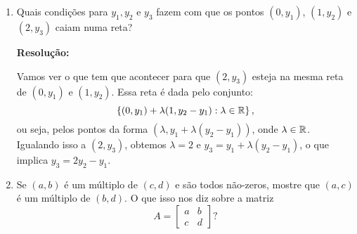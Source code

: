 \documentclass[leqno]{article}
\newenvironment{sol}
{
    \vspace{4mm}
    \noindent\textbf{Resolução:}
    \strut\newline
    \smallskip
    \hspace{-3.5mm}
}
{}
\begin{document}
\begin{enumerate}

%

\item Quais condições para $y_1, y_2$ e $y_3$ fazem com que os pontos $(0, y_1)$, $(1, y_2)$ e $(2, y_3)$ caiam numa reta?

\begin{sol} 
    Vamos ver o que tem que acontecer para que \( (2, y_{ 3 }) \) esteja na mesma reta de \( (0, y_{ 1 }) \) e \( ( 1, y_{ 2 } ) \).
    Essa reta é dada pelo conjunto:
    \begin{equation*}
        \left\{ (0, y_{ 1 }) + \lambda (1, y_{ 2 } - y_{ 1 }) : \lambda \in \mathbb{R} \right\}
    ,\end{equation*}
    ou seja, pelos pontos da forma \( ( \lambda, y_{ 1 } + \lambda ( y_{ 2 } - y_{ 1 } )) \), onde \( \lambda \in \mathbb{R} \).
    Igualando isso a \( ( 2, y_{ 3 } ) \), obtemos \( \lambda = 2 \) e \( y_{ 3 } = y_{ 1 } + \lambda ( y_{ 2 } - y_{ 1 } ) \), o que implica \( y_{ 3 } = 2 y_{ 2 } - y_{ 1 } \).
\end{sol} 

\item Se $(a,b)$ é um múltiplo de $(c,d)$ e são todos não-zeros, mostre que $(a,c)$ é um múltiplo de $(b,d)$. O que isso nos diz sobre a matriz
$$A = \begin{bmatrix}
a & b \\
c & d
\end{bmatrix}?$$ 


\end{enumerate}
\end{document}
